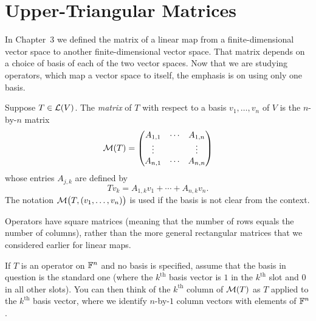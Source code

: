 \iftestbuild %
\setcounter{section}{2}\setcounter{theorem}{34}
\fi %
\DeclareRobustCommand\axtag[1]{\refstepcounter{theorem}\tag{\thetheorem}\label{#1}}
\section{Upper-Triangular Matrices}

In Chapter~3 we defined the matrix of a linear map from a finite-dimensional
vector space to another finite-dimensional vector space. That matrix depends on a
choice of basis of each of the two vector spaces. Now that we are studying
operators, which map a vector space to itself, the emphasis is on using only one
basis.

\begin{definition}\label{ax:5.35}
Suppose $T\in\mathcal{L}(V)$. The \emph{matrix} of $T$ with respect to a basis
$v_1,\dots,v_n$ of $V$ is the $n$-by-$n$ matrix
\[ \mathcal{M}(T) = \begin{pmatrix} A_{1,1} & \cdots & A_{1,n}\\ \vdots & & \vdots\\
   A_{n,1} & \cdots & A_{n,n} \end{pmatrix} \]
whose entries $A_{j,k}$ are defined by
\[ Tv_k = A_{1,k}v_1+\cdots+A_{n,k}v_n. \]
The notation $\mathcal{M}\bigl(T,(v_1,\dots,v_n)\bigr)$ is used if the basis is not
clear from the context.
\end{definition}

Operators have square matrices (meaning that the number of rows equals the
number of columns), rather than the more general rectangular matrices that we
considered earlier for linear maps.

%
If $T$ is an operator on $\mathbb{F}^n$ and no basis is specified, assume that the basis
in question is the standard one (where the $k^{\text{th}}$ basis vector is $1$ in
the $k^{\text{th}}$ slot and $0$ in all other slots). You can then think of the
$k^{\text{th}}$ column of $\mathcal{M}(T)$ as $T$ applied to the $k^{\text{th}}$ basis
vector, where we identify $n$-by-$1$ column vectors with elements of $\mathbb{F}^n$.

